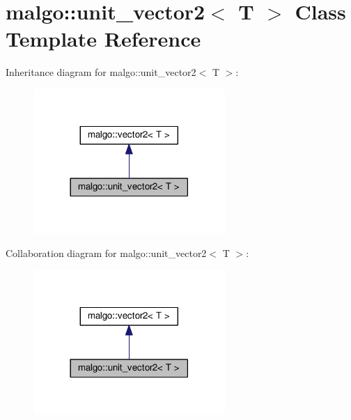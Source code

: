 \hypertarget{classmalgo_1_1unit__vector2}{}\section{malgo\+:\+:unit\+\_\+vector2$<$ T $>$ Class Template Reference}
\label{classmalgo_1_1unit__vector2}


Inheritance diagram for malgo\+:\+:unit\+\_\+vector2$<$ T $>$\+:
\nopagebreak
\begin{figure}[H]
\begin{center}
\leavevmode
\includegraphics[width=206pt]{classmalgo_1_1unit__vector2__inherit__graph}
\end{center}
\end{figure}


Collaboration diagram for malgo\+:\+:unit\+\_\+vector2$<$ T $>$\+:
\nopagebreak
\begin{figure}[H]
\begin{center}
\leavevmode
\includegraphics[width=206pt]{classmalgo_1_1unit__vector2__coll__graph}
\end{center}
\end{figure}

